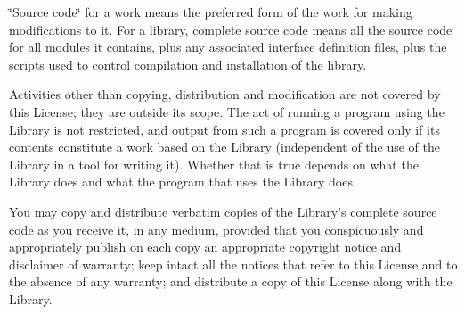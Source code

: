 \char`\"{}\-Source code\char`\"{} for a work means the preferred form of the work for making modifications to it. For a library, complete source code means all the source code for all modules it contains, plus any associated interface definition files, plus the scripts used to control compilation and installation of the library.

Activities other than copying, distribution and modification are not covered by this License; they are outside its scope. The act of running a program using the Library is not restricted, and output from such a program is covered only if its contents constitute a work based on the Library (independent of the use of the Library in a tool for writing it). Whether that is true depends on what the Library does and what the program that uses the Library does.
\begin{DoxyEnumerate}
\item You may copy and distribute verbatim copies of the Library's complete source code as you receive it, in any medium, provided that you conspicuously and appropriately publish on each copy an appropriate copyright notice and disclaimer of warranty; keep intact all the notices that refer to this License and to the absence of any warranty; and distribute a copy of this License along with the Library.
\end{DoxyEnumerate}

